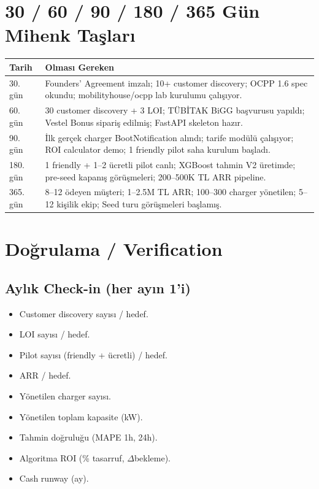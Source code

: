 \documentclass[11pt,a4paper]{article}
\begin{document}
\section{30 / 60 / 90 / 180 / 365 Gün Mihenk Taşları}

\begin{tabularx}{\textwidth}{l X}
\toprule
\textbf{Tarih} & \textbf{Olması Gereken} \\
\midrule
30. gün & Founders' Agreement imzalı; 10+ customer discovery; OCPP 1.6 spec okundu; mobilityhouse/ocpp lab kurulumu çalışıyor. \\
60. gün & 30 customer discovery + 3 LOI; TÜBİTAK BiGG başvurusu yapıldı; Vestel Bonus sipariş edilmiş; FastAPI skeleton hazır. \\
90. gün & İlk gerçek charger BootNotification alındı; tarife modülü çalışıyor; ROI calculator demo; 1 friendly pilot saha kurulum başladı. \\
180. gün & 1 friendly + 1--2 ücretli pilot canlı; XGBoost tahmin V2 üretimde; pre-seed kapanış görüşmeleri; 200--500K TL ARR pipeline. \\
365. gün & 8--12 ödeyen müşteri; 1--2.5M TL ARR; 100--300 charger yönetilen; 5--12 kişilik ekip; Seed turu görüşmeleri başlamış. \\
\bottomrule
\end{tabularx}

\section{Doğrulama / Verification}

\subsection{Aylık Check-in (her ayın 1'i)}

\begin{itemize}
    \item Customer discovery sayısı / hedef.
    \item LOI sayısı / hedef.
    \item Pilot sayısı (friendly + ücretli) / hedef.
    \item ARR / hedef.
    \item Yönetilen charger sayısı.
    \item Yönetilen toplam kapasite (kW).
    \item Tahmin doğruluğu (MAPE 1h, 24h).
    \item Algoritma ROI (\% tasarruf, $\Delta$bekleme).
    \item Cash runway (ay).
\end{itemize}
\end{document}
